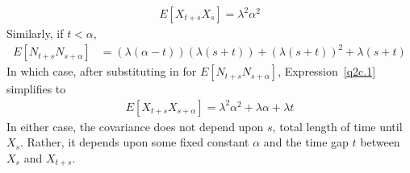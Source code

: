 \documentclass[12pt]{article}
\theoremstyle{plain}
\theoremstyle{definition}
\theoremstyle{remark}
\begin{document}
\begin{enumerate}
\begin{enumerate}
        \begin{align*}
          E[X_{t+s} X_s] = \lambda^2 \alpha^2
        \end{align*}
        Similarly, if $t<\alpha$,
        \begin{align*}
          E[N_{t+s}N_{s+\alpha}]
            &= (\lambda(\alpha-t)) (\lambda (s+t))
              + (\lambda(s+t))^2 + \lambda (s+t)
        \end{align*}
        In which case, after substituting in for
        $E[N_{t+s}N_{s+\alpha}]$, Expression~\ref{q2c.1} simplifies to
        \begin{align*}
          E[X_{t+s}X_{s+\alpha}]
            = \lambda^2 \alpha^2 + \lambda \alpha + \lambda t
        \end{align*}
        In either case, the covariance does not depend upon $s$, total
        length of time until $X_s$. Rather, it depends upon some fixed
        constant $\alpha$ and the time gap $t$ between $X_{s}$ and
        $X_{t+s}$. 

    \end{enumerate}
\end{enumerate}



\end{document}
